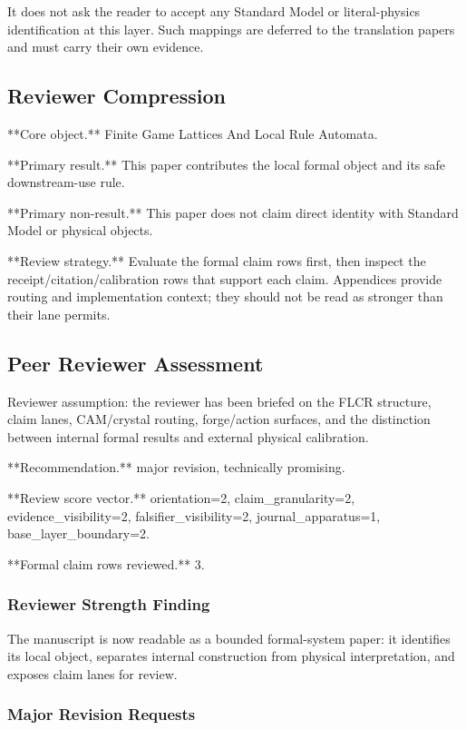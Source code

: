 \documentclass[11pt]{article}
\begin{document}
It does not ask the reader to accept any Standard Model or literal-physics identification at this layer. Such mappings are deferred to the translation papers and must carry their own evidence.

\subsection*{Reviewer Compression}

**Core object.** Finite Game Lattices And Local Rule Automata.

**Primary result.** This paper contributes the local formal object and its safe downstream-use rule.

**Primary non-result.** This paper does not claim direct identity with Standard Model or physical objects.

**Review strategy.** Evaluate the formal claim rows first, then inspect the receipt/citation/calibration rows that support each claim. Appendices provide routing and implementation context; they should not be read as stronger than their lane permits.

\subsection*{Peer Reviewer Assessment}

Reviewer assumption: the reviewer has been briefed on the FLCR structure, claim lanes, CAM/crystal routing, forge/action surfaces, and the distinction between internal formal results and external physical calibration.

**Recommendation.** major revision, technically promising.

**Review score vector.** orientation=2, claim\_granularity=2, evidence\_visibility=2, falsifier\_visibility=2, journal\_apparatus=1, base\_layer\_boundary=2.

**Formal claim rows reviewed.** 3.

\subsubsection*{Reviewer Strength Finding}

The manuscript is now readable as a bounded formal-system paper: it identifies its local object, separates internal construction from physical interpretation, and exposes claim lanes for review.

\subsubsection*{Major Revision Requests}
\end{document}
